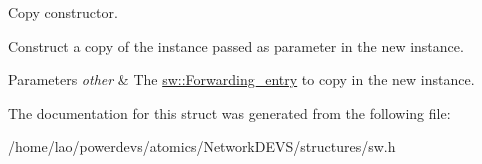 Copy constructor. 

Construct a copy of the instance passed as parameter in the new instance.


\begin{DoxyParams}{Parameters}
{\em other} & The \hyperlink{structsw_1_1Forwarding__entry}{sw\+::\+Forwarding\+\_\+entry} to copy in the new instance. \\
\hline
\end{DoxyParams}


The documentation for this struct was generated from the following file\+:\begin{DoxyCompactItemize}
\item 
/home/lao/powerdevs/atomics/\+Network\+D\+E\+V\+S/structures/sw.\+h\end{DoxyCompactItemize}
